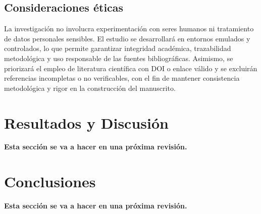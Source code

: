 \documentclass[12pt,a4paper]{article}
\newcommand{\revisionpendiente}{
    \begin{center}
    \setlength{\fboxsep}{8pt}
    \colorbox{yellow!45}{
        \parbox{0.9\linewidth}{
            \centering \textbf{Esta sección se va a hacer en una próxima revisión.}
        }
    }
    \end{center}
}
\begin{document}
\subsection{Consideraciones éticas}

La investigación no involucra experimentación con seres humanos ni tratamiento de datos personales sensibles. El estudio se desarrollará en entornos emulados y controlados, lo que permite garantizar integridad académica, trazabilidad metodológica y uso responsable de las fuentes bibliográficas. Asimismo, se priorizará el empleo de literatura científica con DOI o enlace válido y se excluirán referencias incompletas o no verificables, con el fin de mantener consistencia metodológica y rigor en la construcción del manuscrito.

\section{Resultados y Discusión}

\revisionpendiente

\section{Conclusiones}

\revisionpendiente

\printbibliography[title={Referencias Bibliográficas}]
\end{document}
